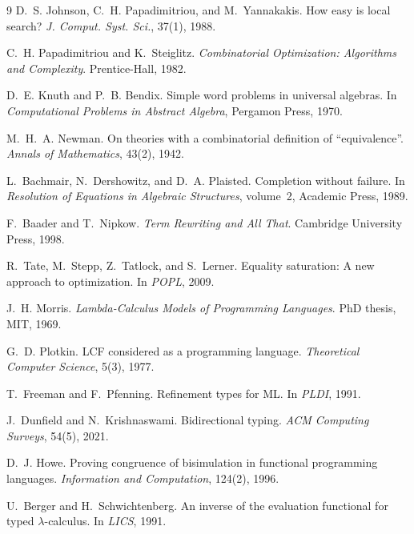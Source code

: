 \documentclass[sigconf,nonacm]{acmart}
\theoremstyle{definition}
\theoremstyle{plain}
\theoremstyle{remark}
\begin{document}
\begin{thebibliography}{9}
D.~S. Johnson, C.~H. Papadimitriou, and M.~Yannakakis.
\newblock How easy is local search?
\newblock \emph{J. Comput. Syst. Sci.}, 37(1), 1988.

C.~H. Papadimitriou and K.~Steiglitz.
\newblock \emph{Combinatorial Optimization: Algorithms and
Complexity}.
\newblock Prentice-Hall, 1982.

D.~E. Knuth and P.~B. Bendix.
\newblock Simple word problems in universal algebras.
\newblock In \emph{Computational Problems in Abstract Algebra},
Pergamon Press, 1970.

M.~H.~A. Newman.
\newblock On theories with a combinatorial definition of
``equivalence''.
\newblock \emph{Annals of Mathematics}, 43(2), 1942.

L.~Bachmair, N.~Dershowitz, and D.~A. Plaisted.
\newblock Completion without failure.
\newblock In \emph{Resolution of Equations in Algebraic Structures},
volume~2, Academic Press, 1989.

F.~Baader and T.~Nipkow.
\newblock \emph{Term Rewriting and All That}.
\newblock Cambridge University Press, 1998.

R.~Tate, M.~Stepp, Z.~Tatlock, and S.~Lerner.
\newblock Equality saturation: A new approach to optimization.
\newblock In \emph{POPL}, 2009.

J.~H. Morris.
\newblock \emph{Lambda-Calculus Models of Programming Languages}.
\newblock PhD thesis, MIT, 1969.

G.~D. Plotkin.
\newblock LCF considered as a programming language.
\newblock \emph{Theoretical Computer Science}, 5(3), 1977.

T.~Freeman and F.~Pfenning.
\newblock Refinement types for ML.
\newblock In \emph{PLDI}, 1991.

J.~Dunfield and N.~Krishnaswami.
\newblock Bidirectional typing.
\newblock \emph{ACM Computing Surveys}, 54(5), 2021.

D.~J. Howe.
\newblock Proving congruence of bisimulation in functional
programming languages.
\newblock \emph{Information and Computation}, 124(2), 1996.

U.~Berger and H.~Schwichtenberg.
\newblock An inverse of the evaluation functional for typed
$\lambda$-calculus.
\newblock In \emph{LICS}, 1991.

\end{thebibliography}
\end{document}
